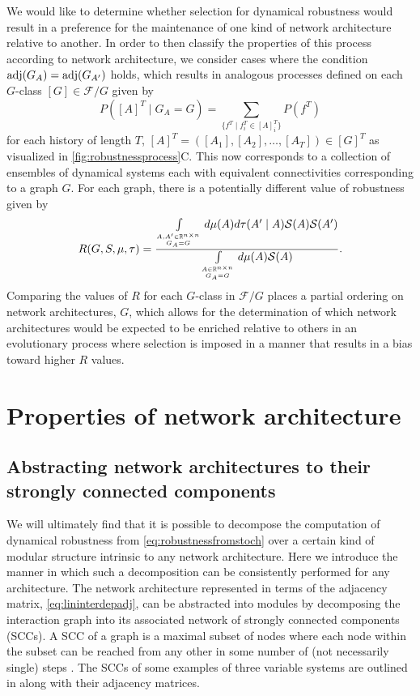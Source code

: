 We would like to determine whether selection for dynamical robustness would result in a preference for the maintenance of one kind of network architecture relative to another. In order to then classify the properties of this process according to network architecture, we consider cases where the condition $\mathrm{adj}(G_A) = \mathrm{adj}(G_{A'})$ holds, which results in analogous processes defined on each $G$-class $[G] \in \mathcal{F}/G$ given by
$$
P([A]^T \mid G_A {=} G) = \sum_{ \{ f^T \mid f_i^T \in [A]_i^T \} } P(f^T)
$$
for each history of length $T$, $[A]^T = ( [A_1], [A_2], \ldots, [A_T] ) \in [G]^T$
as visualized in \ref{fig:robustnessprocess}C. This now corresponds to a collection of ensembles of dynamical systems each with equivalent connectivities corresponding to a graph $G$. For each graph, there is a potentially different value of robustness given by
\begin{equation}\label{eq:robustnessbygraph}
\begin{aligned}
R(G,S,\mu,\tau)  =
 \frac{\int\limits_{A,A' \in \mathbb{R}^{n \times n} \atop G_A = G} d\mu(A) d\tau(A' \mid A) \mathcal{S}(A) \mathcal{S}(A')}{\int\limits_{A \in \mathbb{R}^{n \times n} \atop G_A = G} d\mu(A) \mathcal{S}(A)}.
\end{aligned}
\end{equation}
Comparing the values of $R$ for each $G$-class in $\mathcal{F}/G$ places a partial ordering on network architectures, $G$, which allows for the determination of which network architectures would be expected to be enriched relative to others in an evolutionary process where selection is imposed in a manner that results in a bias toward higher $R$ values.

\section{Properties of network architecture}

\subsection{Abstracting network architectures to their strongly connected components}
We will ultimately find that it is possible to decompose the computation of dynamical robustness from \ref{eq:robustnessfromstoch} over a certain kind of modular structure intrinsic to any network architecture. Here we introduce the manner in which such a decomposition can be consistently performed for any architecture. The network architecture represented in terms of the adjacency matrix, \ref{eq:lininterdepadj}, can be abstracted into modules by decomposing the interaction graph into its associated network of strongly connected components (SCCs). A SCC of a graph is a maximal subset of nodes where each node within the subset can be reached from any other in some number of (not necessarily single) steps \cite{Cormen2009}. The SCCs of some examples of three variable systems are outlined in  along with their adjacency matrices.

